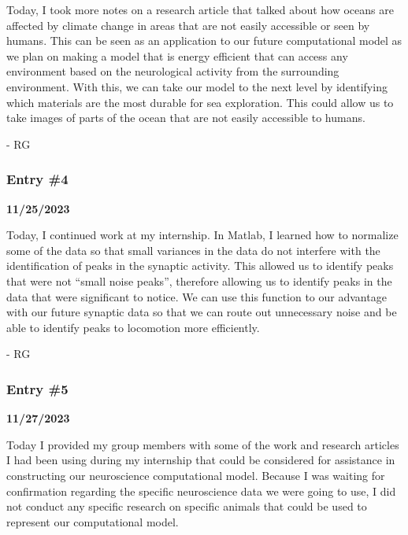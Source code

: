 Today, I took more notes on a research article that talked about how
oceans are affected by climate change in areas that are not easily
accessible or seen by humans. This can be seen as an application to our
future computational model as we plan on making a model that is energy
efficient that can access any environment based on the neurological
activity from the surrounding environment. With this, we can take our
model to the next level by identifying which materials are the most
durable for sea exploration. This could allow us to take images of parts
of the ocean that are not easily accessible to humans.

- RG

\subsubsection{\texorpdfstring{\hfill\break
}{ }}\label{section-9}

\subsubsection{Entry \#4}\label{entry-4}

\textbf{11/25/2023}

Today, I continued work at my internship. In Matlab, I learned how to
normalize some of the data so that small variances in the data do not
interfere with the identification of peaks in the synaptic activity.
This allowed us to identify peaks that were not ``small noise peaks'',
therefore allowing us to identify peaks in the data that were
significant to notice. We can use this function to our advantage with
our future synaptic data so that we can route out unnecessary noise and
be able to identify peaks to locomotion more efficiently.

- RG

\subsubsection{Entry \#5}\label{entry-5}

\textbf{11/27/2023}

Today I provided my group members with some of the work and research
articles I had been using during my internship that could be considered
for assistance in constructing our neuroscience computational model.
Because I was waiting for confirmation regarding the specific
neuroscience data we were going to use, I did not conduct any specific
research on specific animals that could be used to represent our
computational model.

